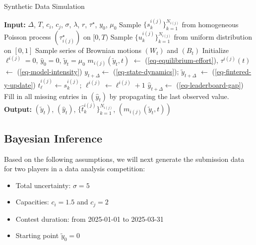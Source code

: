 \documentclass[mnsc]{informs3}
\begin{document}
\begin{algorithm}
\caption{Synthetic Data Simulation}
\begin{algorithmic}
\STATE \textbf{Input:} 
	$\Delta$, $T$, $c_i$, $c_j$, $\sigma$, $\lambda$, $r$, $\tau^\star$, $y_0$, $\mu_0$
\STATE Sample $\{s_k^{i(j)}\}^{N_{i(j)}}_{k=1}$ from homogeneous Poisson process $(\tau^\star_{i(j)})$ on $[0, T)$
\STATE Sample $\{u_k^{i(j)}\}^{N_{i(j)}}_{k=1}$ from uniform distribution on $[0, 1]$
\STATE Sample series of Brownian motions $(W_t)$ and $(B_t)$
\STATE Initialize $\ell^{i(j)}=0$, $\hat{y}_0 = 0$, $\tilde{y}_t=\mu_0$
    \STATE $m_{i(j)}(\tilde{y}_t, t)$  $\gets$ (\ref{eq-equilibrium-effort}), $\tau^{i(j)}(t)$ $\gets$ (\ref{eq-model-intensity})
    \hfill {}
    \STATE $y_{t+\Delta} \gets$ (\ref{eq-state-dynamics}); $\tilde{y}_{t+\Delta}$ $\gets$ (\ref{eq-fintered-y-update})
    \hfill {}
    \FOR{$s_{k}^{i(j)} \in [t, t+\Delta)$} 
        	    \STATE $\hat{t}^{i(j)}_{\ell} \gets s_{k}^{i(j)}$; $\ell^{i(j)} \gets \ell^{i(j)}+1$
	    \hfill {}
	    \STATE $\hat{y}_{t+\Delta} \gets $ (\ref{eq-leaderboard-gap})
	    \hfill {}
        \ENDIF
    \ENDFOR
\ENDFOR
\STATE Fill in all missing entries in $(\hat{y}_t)$ by propagating the last observed value.
\STATE \textbf{Output:} $(\tilde{y}_t)$, $(\hat{y}_t)$, $\{\hat{t}_k^{i(j)}\}^{N_{i(j)}}_{k=1}$, $(m_{i(j)}(\tilde{y}_t, t))$
\end{algorithmic}
\end{algorithm}

\subsection{Bayesian Inference}

Based on the following assumptions, we will next generate the submission data for two players in a data analysis competition: 
\begin{itemize}
	\item Total uncertainty: $\sigma = 5$
	\item Capacities: $c_i = 1.5$ and $c_j = 2$
	\item Contest duration: from 2025-01-01 to 2025-03-31
	\item Starting point $\tilde{y}_0=0$
\end{itemize}
\end{document}
